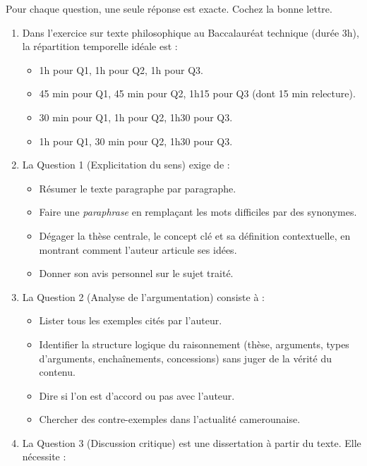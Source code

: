 \documentclass[11pt]{article}
\newcommand{\cle}[1]{{\popxbold\color{popdark}#1}}
\begin{document}
\begin{exercice}
Pour chaque question, une seule réponse est exacte. Cochez la bonne lettre.
\begin{enumerate}
    \item Dans l'exercice sur texte philosophique au Baccalauréat technique (durée 3h), la répartition temporelle idéale est :
    \begin{itemize}
        \item[A)] 1h pour Q1, 1h pour Q2, 1h pour Q3.
        \item[B)] 45 min pour Q1, 45 min pour Q2, 1h15 pour Q3 (dont 15 min relecture).
        \item[C)] 30 min pour Q1, 1h pour Q2, 1h30 pour Q3.
        \item[D)] 1h pour Q1, 30 min pour Q2, 1h30 pour Q3.
    \end{itemize}
    \item La \cle{Question 1} (Explicitation du sens) exige de :
    \begin{itemize}
        \item[A)] Résumer le texte paragraphe par paragraphe.
        \item[B)] Faire une \emph{paraphrase} en remplaçant les mots difficiles par des synonymes.
        \item[C)] Dégager la \cle{thèse} centrale, le \cle{concept} clé et sa \cle{définition contextuelle}, en montrant comment l'auteur articule ses idées.
        \item[D)] Donner son avis personnel sur le sujet traité.
    \end{itemize}
    \item La \cle{Question 2} (Analyse de l'argumentation) consiste à :
    \begin{itemize}
        \item[A)] Lister tous les exemples cités par l'auteur.
        \item[B)] Identifier la \cle{structure logique} du raisonnement (thèse, arguments, types d'arguments, enchaînements, concessions) sans juger de la vérité du contenu.
        \item[C)] Dire si l'on est d'accord ou pas avec l'auteur.
        \item[D)] Chercher des contre-exemples dans l'actualité camerounaise.
    \end{itemize}
    \item La \cle{Question 3} (Discussion critique) est une \cle{dissertation} à partir du texte. Elle nécessite :

\end{enumerate}
\end{exercice}
\end{document}

